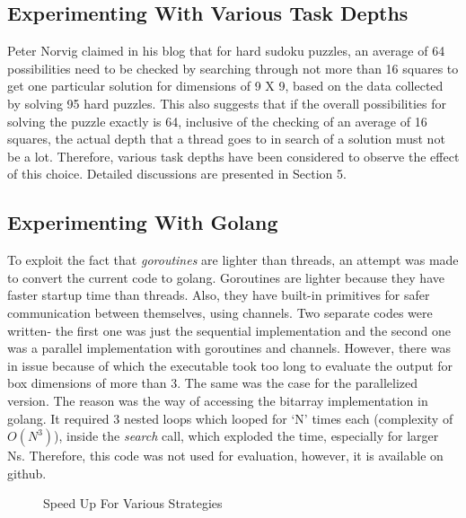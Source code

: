 \documentclass[a4paper,10pt,twoside]{article}
\begin{document}
\subsection{Experimenting With Various Task Depths}
Peter Norvig claimed in his blog that for hard sudoku puzzles, an average of 64 possibilities need to be checked by searching through not more than 16 squares to get one particular solution for dimensions of 9 X 9, based on the data collected by solving 95 hard puzzles. This also suggests that if the overall possibilities for solving the puzzle exactly is 64, inclusive of the checking of an average of 16 squares, the actual depth that a thread goes to in search of a solution must not be a lot. Therefore, various task depths have been considered to observe the effect of this choice. Detailed discussions are presented in Section 5.

\subsection{Experimenting With Golang}
To exploit the fact that \textit{goroutines} are lighter than threads, an attempt was made to convert the current code to golang. Goroutines are lighter because they have faster startup time than threads. Also, they have built-in primitives for safer communication between themselves, using channels. Two separate codes were written- the first one was just the sequential implementation and the second one was a parallel implementation with goroutines and channels. However, there was in issue because of which the executable took too long to evaluate the output for box dimensions of more than 3. The same was the case for the parallelized version. The reason was the way of accessing the bitarray implementation in golang. It required 3 nested loops which looped for `N' times each (complexity of $O(N^{3})$), inside the \textit{search} call, which exploded the time, especially for larger Ns. Therefore, this code was not used for evaluation, however, it is available on github.





\begin{figure}[t]
	\centering
	\caption{Speed Up For Various Strategies}
	\label{fig:ualloc}
\end{figure}
\end{document}
